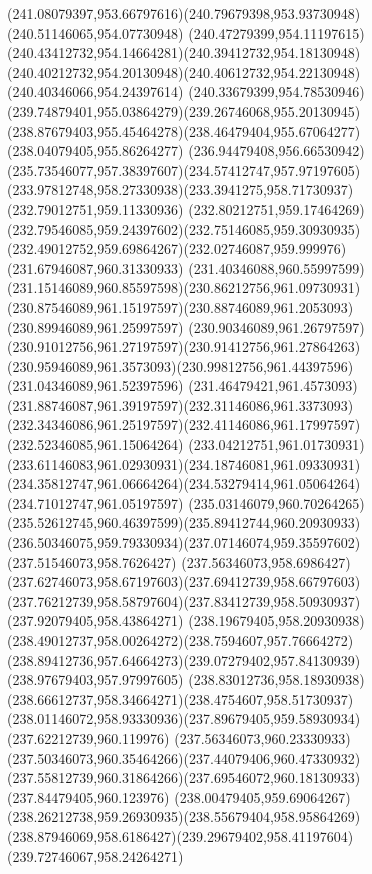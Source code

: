 {{		\curveto(241.08079397,953.66797616)(240.79679398,953.93730948)(240.51146065,954.07730948)
		\curveto(240.47279399,954.11197615)(240.43412732,954.14664281)(240.39412732,954.18130948)
		\curveto(240.40212732,954.20130948)(240.40612732,954.22130948)(240.40346066,954.24397614)
		\curveto(240.33679399,954.78530946)(239.74879401,955.03864279)(239.26746068,955.20130945)
		\curveto(238.87679403,955.45464278)(238.46479404,955.67064277)(238.04079405,955.86264277)
		\curveto(236.94479408,956.66530942)(235.73546077,957.38397607)(234.57412747,957.97197605)
		\curveto(233.97812748,958.27330938)(233.3941275,958.71730937)(232.79012751,959.11330936)
		\curveto(232.80212751,959.17464269)(232.79546085,959.24397602)(232.75146085,959.30930935)
		\curveto(232.49012752,959.69864267)(232.02746087,959.999976)(231.67946087,960.31330933)
		\curveto(231.40346088,960.55997599)(231.15146089,960.85597598)(230.86212756,961.09730931)
		\curveto(230.87546089,961.15197597)(230.88746089,961.2053093)(230.89946089,961.25997597)
		\curveto(230.90346089,961.26797597)(230.91012756,961.27197597)(230.91412756,961.27864263)
		\curveto(230.95946089,961.3573093)(230.99812756,961.44397596)(231.04346089,961.52397596)
		\curveto(231.46479421,961.4573093)(231.88746087,961.39197597)(232.31146086,961.3373093)
		\curveto(232.34346086,961.25197597)(232.41146086,961.17997597)(232.52346085,961.15064264)
		\curveto(233.04212751,961.01730931)(233.61146083,961.02930931)(234.18746081,961.09330931)
		\curveto(234.35812747,961.06664264)(234.53279414,961.05064264)(234.71012747,961.05197597)
		\curveto(235.03146079,960.70264265)(235.52612745,960.46397599)(235.89412744,960.20930933)
		\curveto(236.50346075,959.79330934)(237.07146074,959.35597602)(237.51546073,958.7626427)
		\curveto(237.56346073,958.6986427)(237.62746073,958.67197603)(237.69412739,958.66797603)
		\curveto(237.76212739,958.58797604)(237.83412739,958.50930937)(237.92079405,958.43864271)
		\curveto(238.19679405,958.20930938)(238.49012737,958.00264272)(238.7594607,957.76664272)
		\curveto(238.89412736,957.64664273)(239.07279402,957.84130939)(238.97679403,957.97997605)
		\curveto(238.83012736,958.18930938)(238.66612737,958.34664271)(238.4754607,958.51730937)
		\curveto(238.01146072,958.93330936)(237.89679405,959.58930934)(237.62212739,960.119976)
		\curveto(237.56346073,960.23330933)(237.50346073,960.35464266)(237.44079406,960.47330932)
		\curveto(237.55812739,960.31864266)(237.69546072,960.18130933)(237.84479405,960.123976)
		\curveto(238.00479405,959.69064267)(238.26212738,959.26930935)(238.55679404,958.95864269)
		\curveto(238.87946069,958.6186427)(239.29679402,958.41197604)(239.72746067,958.24264271)
}}
